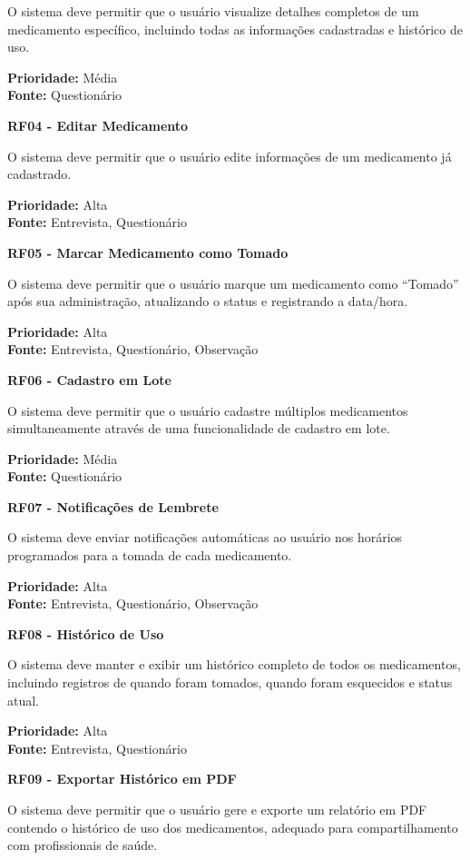 \documentclass[12pt]{article}
\begin{document}
O sistema deve permitir que o usuário visualize detalhes completos de um medicamento específico, incluindo todas as informações cadastradas e histórico de uso.

\textbf{Prioridade:} Média \\
\textbf{Fonte:} Questionário

\textbf{RF04 - Editar Medicamento}

O sistema deve permitir que o usuário edite informações de um medicamento já cadastrado.

\textbf{Prioridade:} Alta \\
\textbf{Fonte:} Entrevista, Questionário

\textbf{RF05 - Marcar Medicamento como Tomado}

O sistema deve permitir que o usuário marque um medicamento como ``Tomado'' após sua administração, atualizando o status e registrando a data/hora.

\textbf{Prioridade:} Alta \\
\textbf{Fonte:} Entrevista, Questionário, Observação

\textbf{RF06 - Cadastro em Lote}

O sistema deve permitir que o usuário cadastre múltiplos medicamentos simultaneamente através de uma funcionalidade de cadastro em lote.

\textbf{Prioridade:} Média \\
\textbf{Fonte:} Questionário

\textbf{RF07 - Notificações de Lembrete}

O sistema deve enviar notificações automáticas ao usuário nos horários programados para a tomada de cada medicamento.

\textbf{Prioridade:} Alta \\
\textbf{Fonte:} Entrevista, Questionário, Observação

\textbf{RF08 - Histórico de Uso}

O sistema deve manter e exibir um histórico completo de todos os medicamentos, incluindo registros de quando foram tomados, quando foram esquecidos e status atual.

\textbf{Prioridade:} Alta \\
\textbf{Fonte:} Entrevista, Questionário

\textbf{RF09 - Exportar Histórico em PDF}

O sistema deve permitir que o usuário gere e exporte um relatório em PDF contendo o histórico de uso dos medicamentos, adequado para compartilhamento com profissionais de saúde.
\end{document}
